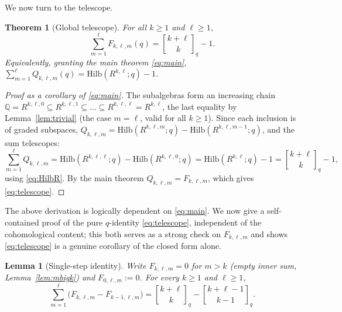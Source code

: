 \documentclass{amsart}
\newtheorem{theorem}{Theorem}
\newtheorem{lemma}{Lemma}
\theoremstyle{definition}
\newcommand{\Hilb}{\mathrm{Hilb}}
\newcommand{\qbin}[2]{\genfrac{[}{]}{0pt}{}{#1}{#2}_q}
\newcommand{\Q}{\mathbb{Q}}
\newcommand{\rkl}{R^{k,\ell}}
\newcommand{\Rklm}{R^{k,\ell,m}}
\begin{document}
We now turn to the telescope.

\begin{theorem}[Global telescope]\label{thm:telescope}
For all $k\ge1$ and $\ell\ge1$,
\begin{equation}\label{eq:telescope}
\sum_{m=1}^{\ell}F_{k,\ell,m}(q)=\qbin{k+\ell}{k}-1 .
\end{equation}
Equivalently, granting the main theorem \eqref{eq:main},
$\sum_{m=1}^{\ell}Q_{k,\ell,m}(q)=\Hilb(\rkl;q)-1$.
\end{theorem}

\begin{proof}[Proof as a corollary of \eqref{eq:main}]
The subalgebras form an increasing chain
$\Q=R^{k,\ell,0}\subseteq R^{k,\ell,1}\subseteq\dots\subseteq R^{k,\ell,\ell}=\rkl$,
the last equality by Lemma~\ref{lem:trivial} (the case $m=\ell$, valid for all
$k\ge1$). Since each inclusion is of graded subspaces,
$Q_{k,\ell,m}=\Hilb(\Rklm;q)-\Hilb(R^{k,\ell,m-1};q)$, and the sum telescopes:
\[
\sum_{m=1}^{\ell}Q_{k,\ell,m}
=\Hilb(R^{k,\ell,\ell};q)-\Hilb(R^{k,\ell,0};q)
=\Hilb(\rkl;q)-1=\qbin{k+\ell}{k}-1,
\]
using \eqref{eq:HilbR}. By the main theorem $Q_{k,\ell,m}=F_{k,\ell,m}$, which gives
\eqref{eq:telescope}.
\end{proof}

The above derivation is logically dependent on \eqref{eq:main}. We now give a
self-contained proof of the pure $q$-identity \eqref{eq:telescope}, independent of
the cohomological content; this both serves as a strong check on $F_{k,\ell,m}$ and
shows \eqref{eq:telescope} is a genuine corollary of the closed form alone.

\begin{lemma}[Single-step identity]\label{lem:step}
Write $F_{k,\ell,m}=0$ for $m>k$ \textup{(}empty inner sum,
Lemma~\ref{lem:mbigk}\textup{)} and $F_{0,\ell,m}:=0$. For every $k\ge1$ and
$\ell\ge1$,
\begin{equation}\label{eq:stepid}
\sum_{m=1}^{\ell}\big(F_{k,\ell,m}-F_{k-1,\ell,m}\big)
=\qbin{k+\ell}{k}-\qbin{k+\ell-1}{k-1}.
\end{equation}
\end{lemma}
\end{document}
